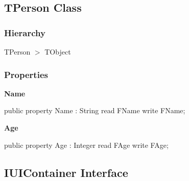 \documentclass{report}
\newif\ifpdf
\begin{document}
\subsection*{TPerson Class}
\fi
\label{ok_attributes.TPerson}
\subsubsection*{\large{\textbf{Hierarchy}}\normalsize\hspace{1ex}\hfill}
TPerson {$>$} TObject
\subsubsection*{\large{\textbf{Properties}}\normalsize\hspace{1ex}\hfill}
\begin{list}{}{
\setlength{\itemindent}{0cm}
\setlength{\listparindent}{0cm}
\setlength{\leftmargin}{\evensidemargin}
\addtolength{\leftmargin}{\tmplength}
\settowidth{\labelsep}{X}
\addtolength{\leftmargin}{\labelsep}
\setlength{\labelwidth}{\tmplength}
}
\label{ok_attributes.TPerson-Name}
\item[\textbf{Name}\hfill]
\ifpdf
\begin{flushleft}
\fi
\begin{ttfamily}
public property Name : String read FName write FName;\end{ttfamily}

\ifpdf
\end{flushleft}
\fi


\par  \label{ok_attributes.TPerson-Age}
\item[\textbf{Age}\hfill]
\ifpdf
\begin{flushleft}
\fi
\begin{ttfamily}
public property Age : Integer read FAge write FAge;\end{ttfamily}

\ifpdf
\end{flushleft}
\fi


\par  \end{list}
\ifpdf
\subsection*{\large{\textbf{IUIContainer Interface}}\normalsize\hspace{1ex}\hrulefill}
\else
\subsection*{IUIContainer Interface}
\fi
\label{ok_attributes.IUIContainer}
\end{document}
